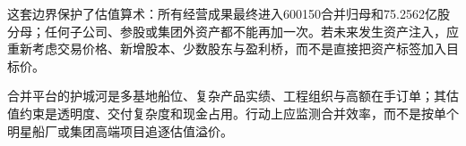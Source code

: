 这套边界保护了估值算术：所有经营成果最终进入600150合并归母和75.2562亿股分母；任何子公司、参股或集团外资产都不能再加一次。若未来发生资产注入，应重新考虑交易价格、新增股本、少数股东与盈利桥，而不是直接把资产标签加入目标价。

\begin{keyinsight}[公司能力的可投资含义]
合并平台的护城河是多基地船位、复杂产品实绩、工程组织与高额在手订单；其估值约束是透明度、交付复杂度和现金占用。行动上应监测合并效率，而不是按单个明星船厂或集团高端项目追逐估值溢价。
\end{keyinsight}

